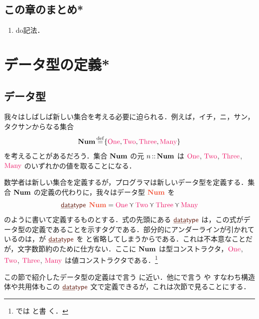 \documentclass[a5paper,twoside,fleqn,draft]{jsbook}
\begin{document}
\section{この章のまとめ*}

\begin{enumerate}
\item do記法．
\end{enumerate}

\chapter{データ型の定義*}
\label{ch:data-type}

\section{データ型}

我々はしばしば新しい集合を考える必要に迫られる．例えば，イチ，ニ，サン，タクサンからなる集合
\begin{equation}
\mSet{Num}\mDefEq\{\mNumOne,\mNumTwo,\mNumThree,\mNumMany\}
\end{equation}
を考えることがあるだろう．集合 $\mathbf{Num}$ の元 $n\operatorname{:\!:}\mathbf{Num}$ は $\mNumOne$, $\mNumTwo$, $\mNumThree$, $\mNumMany$ のいずれかの値を取ることになる．

数学者は新しい集合を定義するが，\haskell プログラマは新しいデータ型を定義する．集合 $\mathbf{Num}$ の定義の代わりに，我々はデータ型
$\mType{Num}$ を
\begin{equation}
  \mDataType\;\mType{Num}
  =\mNumOne\mValueOr\mNumTwo\mValueOr\mNumThree\mValueOr\mNumMany
\end{equation}
のように書いて定義するものとする．式の先頭にある $\mDataType$ は，この式がデータ型の定義であることを示すタグである．部分的にアンダーラインが引かれているのは，\haskell が $\mDataType$ を  と省略してしまうからである．これは不本意なことだが，文字数節約のために仕方ない．ここに $\mathbf{Num}$ は型コンストラクタ，$\mNumOne$, $\mNumTwo$, $\mNumThree$, $\mNumMany$ は値コンストラクタである．\footnote{\haskell では  と書
  く．}


この節で紹介したデータ型の定義は\clang で言う  に近い．他に\clang で言う  や  すなわち構造体や共用体もこの $\mDataType$ 文で定義できるが，これは次節で見ることにする．

\separator
\end{document}
